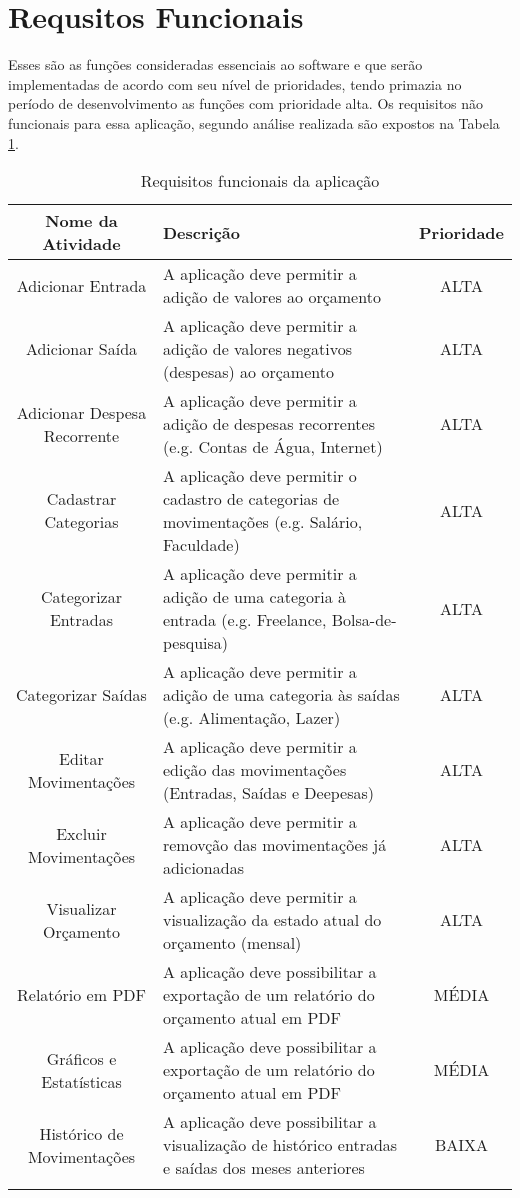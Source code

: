 \documentclass[
	12pt,				%
	oneside,			%
	a4paper,			%
	english,			%
	brazil,				%
	]{abntex2}
\begin{document}
\section{Requsitos Funcionais}
Esses são as funções consideradas essenciais ao software e que serão implementadas de acordo com seu nível de prioridades, tendo
primazia no período de desenvolvimento as funções com prioridade alta. Os requisitos não funcionais para essa aplicação, segundo análise realizada são expostos na Tabela \ref{table:ReqFunc}.
{
\renewcommand*{\arraystretch}{1.6}
\begin{longtable}{|c|p{7cm}|c|}
\hline
 \textbf{Nome da Atividade} & \textbf{Descrição} & \textbf{Prioridade} \\ \midrule
Adicionar Entrada          & A aplicação deve permitir a adição de valores ao orçamento                       & ALTA \\ 
Adicionar Saída            & A aplicação deve permitir a adição de valores negativos (despesas) ao orçamento  & ALTA \\
Adicionar Despesa Recorrente & A aplicação deve permitir a adição de despesas recorrentes (e.g. Contas de Água, Internet) & ALTA \\
Cadastrar Categorias       & A aplicação deve permitir o cadastro de categorias de movimentações (e.g. Salário, Faculdade) & ALTA \\
Categorizar Entradas       & A aplicação deve permitir a adição de uma categoria à entrada (e.g. Freelance, Bolsa-de-pesquisa) & ALTA \\
Categorizar Saídas       & A aplicação deve permitir a adição de uma categoria às saídas (e.g. Alimentação, Lazer) & ALTA \\
Editar Movimentações     & A aplicação deve permitir a edição das movimentações (Entradas, Saídas e Deepesas) & ALTA \\
Excluir Movimentações     & A aplicação deve permitir a removção das movimentações já adicionadas & ALTA \\
Visualizar Orçamento  & A aplicação deve permitir a visualização da estado atual do orçamento (mensal) & ALTA \\
Relatório em PDF      & A aplicação deve possibilitar a exportação de um relatório do orçamento atual em PDF & MÉDIA \\
Gráficos e Estatísticas  & A aplicação deve possibilitar a exportação de um relatório do orçamento atual em PDF & MÉDIA \\
Histórico de Movimentações   & A aplicação deve possibilitar a visualização de histórico entradas e saídas dos meses anteriores & BAIXA \\
\caption{Requisitos funcionais da aplicação}
\label{table:ReqFunc}
\end{longtable}
}



\end{document}
